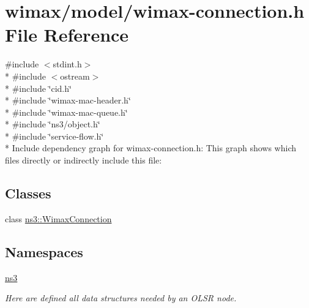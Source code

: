 \hypertarget{wimax-connection_8h}{}\section{wimax/model/wimax-\/connection.h File Reference}
\label{wimax-connection_8h}
{\ttfamily \#include $<$stdint.\+h$>$}\\*
{\ttfamily \#include $<$ostream$>$}\\*
{\ttfamily \#include \char`\"{}cid.\+h\char`\"{}}\\*
{\ttfamily \#include \char`\"{}wimax-\/mac-\/header.\+h\char`\"{}}\\*
{\ttfamily \#include \char`\"{}wimax-\/mac-\/queue.\+h\char`\"{}}\\*
{\ttfamily \#include \char`\"{}ns3/object.\+h\char`\"{}}\\*
{\ttfamily \#include \char`\"{}service-\/flow.\+h\char`\"{}}\\*
Include dependency graph for wimax-\/connection.h\+:
This graph shows which files directly or indirectly include this file\+:
\subsection*{Classes}
\begin{DoxyCompactItemize}
\item 
class \hyperlink{classns3_1_1WimaxConnection}{ns3\+::\+Wimax\+Connection}
\end{DoxyCompactItemize}
\subsection*{Namespaces}
\begin{DoxyCompactItemize}
\item 
 \hyperlink{namespacens3}{ns3}
\begin{DoxyCompactList}\small\item\em Here are defined all data structures needed by an O\+L\+SR node. \end{DoxyCompactList}\end{DoxyCompactItemize}
